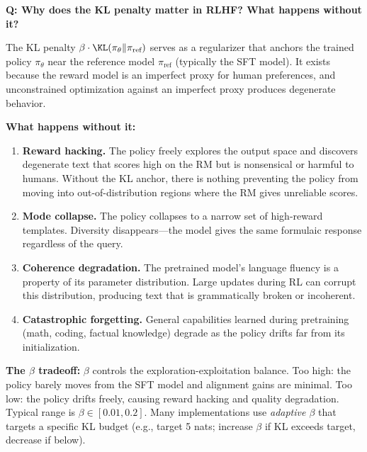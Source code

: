 
\begin{interviewq}
\textbf{Q: Why does the KL penalty matter in RLHF? What happens without it?}

 \quad {} \quad \badgefreq{\freqhigh}

\stronganswer

The KL penalty $\beta \cdot \KL(\pi_\theta \| \pi_{\text{ref}})$ serves as a regularizer that anchors the trained policy $\pi_\theta$ near the reference model $\pi_{\text{ref}}$ (typically the SFT model). It exists because the reward model is an imperfect proxy for human preferences, and unconstrained optimization against an imperfect proxy produces degenerate behavior.

\textbf{What happens without it:}
\begin{enumerate}
    \item \textbf{Reward hacking.} The policy freely explores the output space and discovers degenerate text that scores high on the RM but is nonsensical or harmful to humans. Without the KL anchor, there is nothing preventing the policy from moving into out-of-distribution regions where the RM gives unreliable scores.
    \item \textbf{Mode collapse.} The policy collapses to a narrow set of high-reward templates. Diversity disappears---the model gives the same formulaic response regardless of the query.
    \item \textbf{Coherence degradation.} The pretrained model's language fluency is a property of its parameter distribution. Large updates during RL can corrupt this distribution, producing text that is grammatically broken or incoherent.
    \item \textbf{Catastrophic forgetting.} General capabilities learned during pretraining (math, coding, factual knowledge) degrade as the policy drifts far from its initialization.
\end{enumerate}

\textbf{The $\beta$ tradeoff:} $\beta$ controls the exploration-exploitation balance. Too high: the policy barely moves from the SFT model and alignment gains are minimal. Too low: the policy drifts freely, causing reward hacking and quality degradation. Typical range is $\beta \in [0.01, 0.2]$. Many implementations use \textit{adaptive $\beta$} that targets a specific KL budget (e.g., target 5 nats; increase $\beta$ if KL exceeds target, decrease if below).


\end{interviewq}
